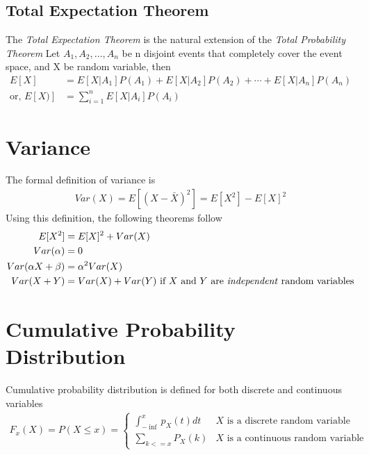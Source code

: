 \documentclass[../probability-notes.tex]{subfiles}
\begin{document}
    \subsection{Total Expectation Theorem}
    The \emph{Total Expectation Theorem} is the natural extension of the \emph{Total Probability Theorem}
    Let $A_{1}, A_{2}, \ldots, A_{n}$ be n disjoint events that completely cover the event space, and X be random variable, then
    \begin{align*}
        E[X] &= E[X|A_{1}]P(A_{1}) + E[X|A_{2}]P(A_{2}) + \cdots + E[X|A_{n}]P(A_{n})\\
        \text{or, } E[X)] &= \sum_{i=1}^{n} E[X|A_{i}]P(A_{i})
    \end{align*}

    \section{Variance}
    The formal definition of variance is
    \begin{align*}
        Var(X) = E[(X - \bar{X})^{2}] = E[X^{2}] - E[X]^{2}
    \end{align*}
    Using this definition, the following theorems follow
    \begin{align*}
        E[X^{2}] &= E[X]^{2} + Var(X) \\
        Var(\alpha) &= 0 \\
        Var(\alpha X + \beta) &= \alpha^{2} Var(X) \\
        Var(X + Y) &= Var(X) + Var(Y) \text{  if $X$ and $Y$ are \emph{independent} random variables}
    \end{align*}

    \section{Cumulative Probability Distribution}
    Cumulative probability distribution is defined for both discrete and continuous variables
    \begin{align*}
        F_{x}(X) = P(X \leq x) = \begin{cases} \int_{-\inf}^{x} p_{X}(t) dt &\mbox{$X$ is a discrete random variable}\\
        \sum_{k <= x} P_{X}(k) &\mbox{$X$ is a continuous random variable} \end{cases}
    \end{align*}


\end{document}
